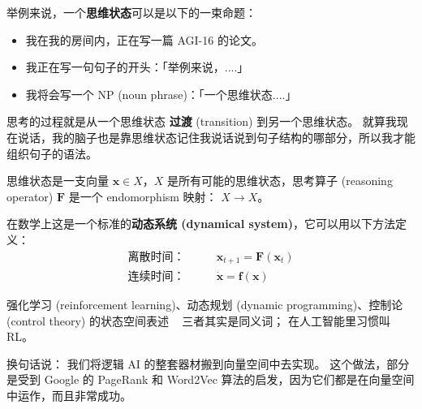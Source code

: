 \documentclass[orivec]{llncs}
\newcommand{\emp}[1]{\textbf{\textcolor{Cerulean}{#1}}}
\newcommand{\vect}[1]{\boldsymbol{#1}}
\begin{document}
举例来说，一个\emp{思维状态}可以是以下的一束命题：
\let\labelitemi\labelitemii
\begin{itemize}
\item 我在我的房间内，正在写一篇 AGI-16 的论文。
\item 我正在写一句句子的开头：「举例来说，....」
\item 我将会写一个 NP (noun phrase)：「一个思维状态....」
\end{itemize}

思考的过程就是从一个思维状态 \emp{过渡} (transition) 到另一个思维状态。 就算我现在说话，我的脑子也是靠思维状态记住我说话说到句子结构的哪部分，所以我才能组织句子的语法。

思维状态是一支向量 $\vect{x} \in X$，$X$ 是所有可能的思维状态，思考算子 (reasoning operator) $\vect{F}$ 是一个 endomorphism 映射： $X \rightarrow X$。

在数学上这是一个标准的\emp{动态系统 (dynamical system)}，它可以用以下方法定义：
\begin{eqnarray}
\mbox{离散时间：} \quad \quad & \vect{x}_{t+1} = \vect{F}(\vect{x}_t) \\
\mbox{连续时间：} \quad \quad & \dot{\vect{x}} = \vect{f}(\vect{x}) \label{eqn1}
\end{eqnarray}

强化学习 (reinforcement learning)、动态规划 (dynamic programming)、控制论 (control theory) 的状态空间表述 ~ 三者其实是同义词； 在人工智能里习惯叫 RL。



换句话说： 我们将逻辑 AI 的整套器材搬到向量空间中去实现。 这个做法，部分是受到 Google 的 PageRank \cite{Page1999} 和 Word2Vec \cite{Mikolov2013} 算法的启发，因为它们都是在向量空间中运作，而且非常成功。 %
\end{document}
